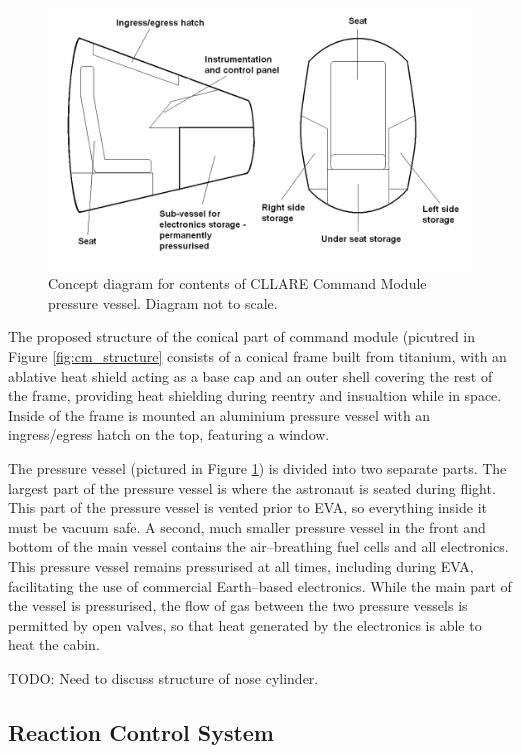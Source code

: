 \documentclass{report}
\begin{document}
\begin{figure}[ht] \label{fig:cm_internals}
\centering
\includegraphics[scale=0.3]{images/cllare_cm_pressure_vessel_contents}
\caption{Concept diagram for contents of CLLARE Command Module pressure vessel.  Diagram not to scale.}
\end{figure}

The proposed structure of the conical part of command module (picutred in Figure \ref{fig:cm_structure} consists of a conical frame built from titanium, with an ablative heat shield acting as a base cap and an outer shell covering the rest of the frame, providing heat shielding during reentry and insualtion while in space.  Inside of the frame is mounted an aluminium pressure vessel with an ingress/egress hatch on the top, featuring a window.

The pressure vessel (pictured in Figure \ref{fig:cm_internals}) is divided into two separate parts.  The largest part of the pressure vessel is where the astronaut is seated during flight.  This part of the pressure vessel is vented prior to EVA, so everything inside it must be vacuum safe.  A second, much smaller pressure vessel in the front and bottom of the main vessel contains the air--breathing fuel cells and all electronics.  This pressure vessel remains pressurised at all times, including during EVA, facilitating the use of commercial Earth--based electronics.  While the main part of the vessel is pressurised, the flow of gas between the two pressure vessels is permitted by open valves, so that heat generated by the electronics is able to heat the cabin.

TODO: Need to discuss structure of nose cylinder.

\subsection{Reaction Control System}
\end{document}
